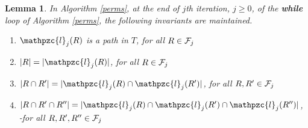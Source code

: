 \documentclass{CRPITStyle} %
\def\cF{{\cal F}}
\def\cl{\mathpzc{l}}
\def\invb{\textreferencemark}
\def\topshrink{-2mm}
\newtheorem{lemma}[theorem]{Lemma} %
\begin{document}
\begin{lemma}
  \label{lem:invar1} In Algorithm \ref{perms}, at the end of $j$th
  iteration, $j \ge 0$, of the {\bf while} loop of Algorithm
  \ref{perms}, the following invariants are maintained.


  \begin{enumerate}[I {\textreferencemark}] \vspace{\topshrink}
  \item $\cl_j(R)$ is a path in $T$,\hfill 
    for all $R \in \cF_j$\vspace{\topshrink}
  \item $|R| = |\cl_j(R)|$,\hfill 
    for all $R \in \cF_j$\vspace{\topshrink}
  \item $|R \cap R'| = |\cl_j(R) \cap \cl_j(R')|$,\hfill 
    for all $R, R' \in \cF_j$\vspace{\topshrink}
  \item $|R \cap R' \cap R''|=|\cl_j(R) \cap \cl_j(R') \cap
    \cl_j(R'')|$,\\ {-}\hfill for all $R, R', R'' \in \cF_j$
  \end{enumerate}

\end{lemma}
\end{document}
